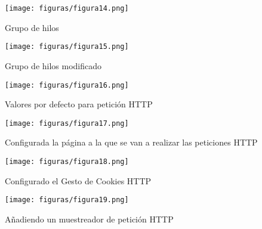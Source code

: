 \begin{figure}[H] %
	\centering
	\texttt{[image: figuras/figura14.png]}  %
	
	
	\caption{Grupo de hilos}
	\label{figura14}
\end{figure}

\begin{figure}[H] %
	\centering
	\texttt{[image: figuras/figura15.png]}  %
	
	
	\caption{Grupo de hilos modificado}
	\label{figura15}
\end{figure}

\begin{figure}[H] %
	\centering
	\texttt{[image: figuras/figura16.png]}  %
	
	
	\caption{Valores por defecto para petición HTTP}
	\label{figura16}
\end{figure}

\begin{figure}[H] %
	\centering
	\texttt{[image: figuras/figura17.png]}  %
	
	
	\caption{Configurada la página a la que se van a realizar las peticiones HTTP}
	\label{figura17}
\end{figure}

\begin{figure}[H] %
	\centering
	\texttt{[image: figuras/figura18.png]}  %
	
	
	\caption{Configurado el Gesto de Cookies HTTP}
	\label{figura18}
\end{figure}

\begin{figure}[H] %
	\centering
	\texttt{[image: figuras/figura19.png]}  %
	
	
	\caption{Añadiendo un muestreador de petición HTTP}
	\label{figura19}
\end{figure}

